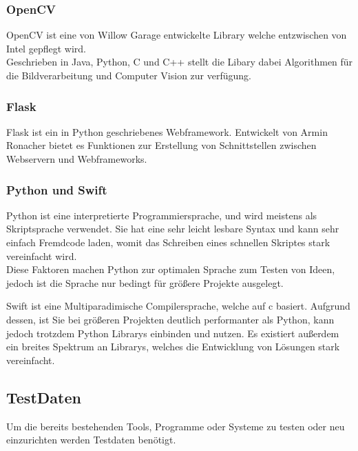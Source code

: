 \documentclass[
]{article}
\begin{document}
\hypertarget{header-n24}{%
\subsubsection{OpenCV}\label{header-n24}}

OpenCV ist eine von Willow Garage entwickelte Library welche entzwischen
von Intel gepflegt wird. \\
Geschrieben in Java, Python, C und C++ stellt die Libary dabei
Algorithmen für die Bildverarbeitung und Computer Vision zur verfügung.

\hypertarget{header-n26}{%
\subsubsection{Flask}\label{header-n26}}

Flask ist ein in Python geschriebenes Webframework. Entwickelt von Armin
Ronacher bietet es Funktionen zur Erstellung von Schnittstellen zwischen
Webservern und Webframeworks.

\hypertarget{header-n28}{%
\subsubsection{Python und Swift}\label{header-n28}}

Python ist eine interpretierte Programmiersprache, und wird meistens als
Skriptsprache verwendet. Sie hat eine sehr leicht lesbare Syntax und
kann sehr einfach Fremdcode laden, womit das Schreiben eines schnellen
Skriptes stark vereinfacht wird.\\
Diese Faktoren machen Python zur optimalen Sprache zum Testen von Ideen,
jedoch ist die Sprache nur bedingt für größere Projekte ausgelegt.

Swift ist eine Multiparadimische Compilersprache, welche auf c basiert.
Aufgrund dessen, ist Sie bei größeren Projekten deutlich performanter
als Python, kann jedoch trotzdem Python Librarys einbinden und nutzen.
Es existiert außerdem ein breites Spektrum an Librarys, welches die
Entwicklung von Lösungen stark vereinfacht.

\hypertarget{header-n31}{%
\subsection{TestDaten}\label{header-n31}}

Um die bereits bestehenden Tools, Programme oder Systeme zu testen oder
neu einzurichten werden Testdaten benötigt.
\end{document}
